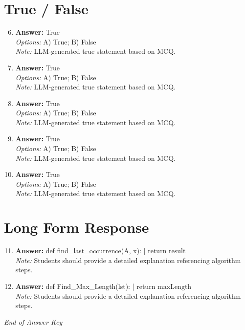 \documentclass[12pt]{article}
\begin{document}
\section*{True / False}
\begin{enumerate}[label=\arabic*.]
\setcounter{enumi}{5}
\item \textbf{Answer:} True
\\ \textit{Options:} A) True; B) False
\\ \textit{Note:} LLM-generated true statement based on MCQ.
\item \textbf{Answer:} True
\\ \textit{Options:} A) True; B) False
\\ \textit{Note:} LLM-generated true statement based on MCQ.
\item \textbf{Answer:} True
\\ \textit{Options:} A) True; B) False
\\ \textit{Note:} LLM-generated true statement based on MCQ.
\item \textbf{Answer:} True
\\ \textit{Options:} A) True; B) False
\\ \textit{Note:} LLM-generated true statement based on MCQ.
\item \textbf{Answer:} True
\\ \textit{Options:} A) True; B) False
\\ \textit{Note:} LLM-generated true statement based on MCQ.
\end{enumerate}

\section*{Long Form Response}
\begin{enumerate}[label=\arabic*.]
\setcounter{enumi}{10}
\item \textbf{Answer:} def find\_last\_occurrence(A, x): | return result
\\ \textit{Note:} Students should provide a detailed explanation referencing algorithm steps.
\item \textbf{Answer:} def Find\_Max\_Length(lst): | return maxLength
\\ \textit{Note:} Students should provide a detailed explanation referencing algorithm steps.
\end{enumerate}

\vfill
\noindent\textit{End of Answer Key}
\end{document}
